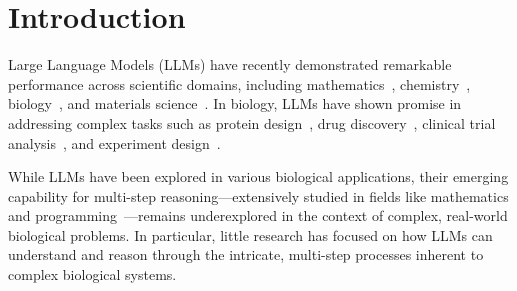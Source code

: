 \section{Introduction}
Large Language Models (LLMs) have recently demonstrated remarkable performance across scientific domains, including mathematics~\citep{yu2023metamath}, chemistry~\citep{liu2023multi, zhu2022torchdrug}, biology~\citep{hayes2024simulating, madani2020progen, ma2023retrieved}, and materials science~\citep{zheng2023shaping, park2024multi}. In biology, LLMs have shown promise in addressing complex tasks such as protein design~\citep{valentini2023promises, hosseini2024text2protein}, drug discovery~\citep{m2024augmenting, liu2023chatgpt}, clinical trial analysis~\citep{singhal2023large, jin2023matching}, and experiment design~\citep{ai4science2023impact, roohani2024biodiscoveryagent}.


While LLMs have been explored in various biological applications, their emerging capability for multi-step reasoning—extensively studied in fields like mathematics and programming~\citep{wei2022chain, wang2022self, kojima2022large}—remains underexplored in the context of complex, real-world biological problems. In particular, little research has focused on how LLMs can understand and reason through the intricate, multi-step processes inherent to complex biological systems.





